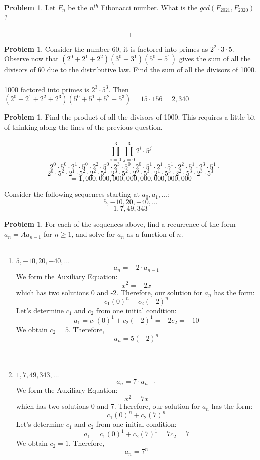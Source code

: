\documentclass[10pt,leqno ]{article}
\theoremstyle{definition}
\newtheorem{problem}[theorem]{Problem}
\begin{document}
\begin{problem} Let $F_n$ be the $n^{th}$ Fibonacci number.  What is the $gcd(F_{2021}, F_{2020})$?
\\\\
\Large
$$1$$
\end{problem}
\newpage

\begin{problem} Consider the number 60, it is factored into primes as $2^2 \cdot 3 \cdot 5$.  Observe now that $(2^0+ 2^1+ 2^2)(3^0+ 3^1)(5^0+ 5^1)$ gives the sum of all the divisors of 60 due to the distributive law.  Find the sum of all the divisors of 1000.
\\\\
\Large
1000 factored into primes is $2^3 \cdot 5^3$.  Then $(2^0 + 2^1 + 2^2 + 2^3)( 5^0 + 5^1 + 5^2 + 5^3) = 15 \cdot 156 = 2,340$
\end{problem}
\newpage

\begin{problem} Find the product of all the divisors of 1000.  This requires a little bit of thinking along the lines of the previous question.
\\\\
\Large
$$\prod_{i=0}^{3} \prod_{j=0}^{3}2^i \cdot 5^j$$
$$= 2^0 \cdot 5^0 \cdot 2^1 \cdot 5^0 \cdot 2^2 \cdot 5^0 \cdot 2^3 \cdot 5^0 \cdot 2^0 \cdot 5^1 \cdot 2^1 \cdot 5^1 \cdot 2^2 \cdot 5^1 \cdot 2^3 \cdot 5^1 \cdot$$
$$2^0 \cdot 5^2 \cdot 2^1 \cdot 5^2 \cdot 2^2 \cdot 5^2 \cdot 2^3 \cdot 5^2 \cdot 2^0 \cdot 5^3 \cdot 2^1 \cdot 5^3 \cdot 2^2 \cdot 5^3 \cdot 2^3 \cdot 5^3$$
$$ = 1,000,000,000,000,000,000,000,000$$
\end{problem}
\newpage

Consider the following sequences starting at $a_0, a_1, \dots$:
$$5, -10, 20, -40, \dots$$
$$ 1, 7, 49, 343$$
\begin{problem} For each of the sequences above, find a recurrence of the form $a_n = Aa_{n-1}$ for $n \geq 1$, and solve for $a_n$ as a function of $n$.
\\\\
\begin{enumerate}[label=\alph*)]
\item $5, -10, 20, -40, \dots$
$$a_n = -2 \cdot a_{n-1}$$
We form the Auxiliary Equation: 
$$x^2 = -2x$$
which has two solutions 0 and -2.   Therefore, our solution for $a_n$ has the form:
$$c_1(0)^n + c_2(-2)^n$$
Let's determine $c_1$ and $c_2$ from one initial condition:
$$a_1 = c_1(0)^1 + c_2(-2)^1 = -2c_2 = -10$$
We obtain $c_2 = 5$.  Therefore,
$$a_n = 5(-2)^n$$
\\\\
\item $1, 7, 49, 343, \dots$
$$a_n = 7 \cdot a_{n-1}$$
We form the Auxiliary Equation: 
$$x^2 = 7x$$
which has two solutions 0 and 7.   Therefore, our solution for $a_n$ has the form:
$$c_1(0)^n + c_2(7)^n$$
Let's determine $c_1$ and $c_2$ from one initial condition:
$$a_1 = c_1(0)^1 + c_2(7)^1 = 7c_2 = 7$$
We obtain $c_2 = 1$.  Therefore,
$$a_n = 7^n$$
\end{enumerate}
\end{problem}
\newpage
\end{document}
